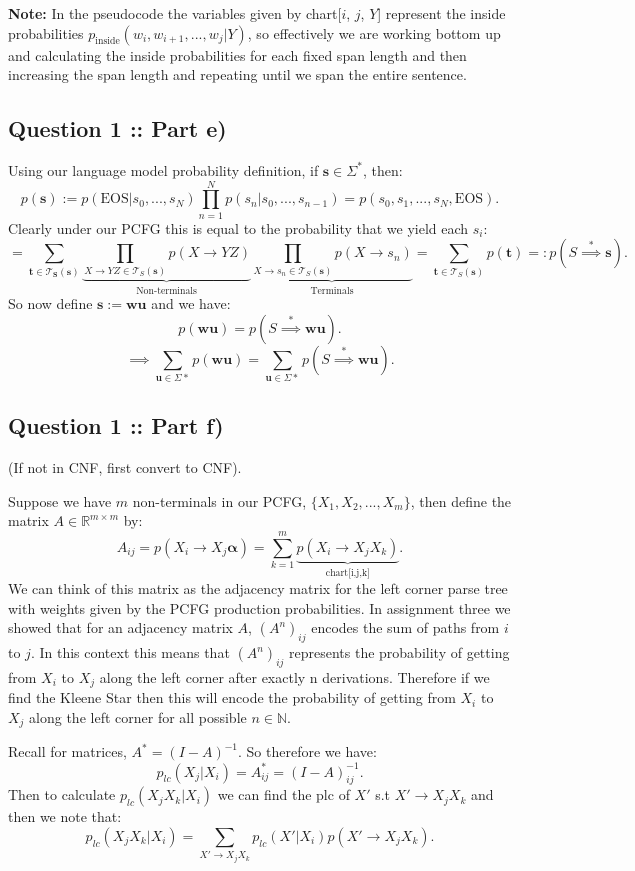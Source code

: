\documentclass[a4paper]{article}
\begin{document}
\textbf{Note:} In the pseudocode the variables given by chart[$i$, $j$, $Y$]
represent the inside probabilities $p_{\text{inside}}(w_i, w_{i+1}, ..., w_{j} | Y)$,
so effectively we are working bottom up and calculating the inside probabilities for each 
fixed span length and then increasing the span length and repeating until we span the entire sentence.

\subsection*{Question 1 :: Part e)}
Using our language model probability definition, if $\bm{s}\in \Sigma^*$, then:
\[
p(\bm{s}) := p(\text{EOS} | s_0, ..., s_N) \prod_{n=1}^{N} p(s_n | s_0,...,s_{n-1}) = p(s_0, s_1,..., s_N, \text{EOS})
.\]
Clearly under our PCFG this is equal to the probability that we yield each $s_i$:
 \[
     = \sum_{\bm{t \in \mathcal{T}_S(\bm{s})}} \underbrace{\prod_{X\to Y Z \in \mathcal{T}_S(\bm{s})} p(X\to Y Z)}_{\text{Non-terminals}} \underbrace{\prod_{X\to s_n \in \mathcal{T}_S(\bm{s})} p(X\to s_n) }_{\text{Terminals}} = \sum_{\bm{t} \in \mathcal{T}_S(\bm{s})} p(\bm{t}) =: p(S \stackrel{*}{\implies} \bm{s})
.\]
So now define $\bm{s}:=\bm{wu}$ and we have:
\[
p(\bm{wu}) =  p(S \stackrel{*}{\implies} \bm{wu})
.\]
\[
\implies \sum_{\bm{u} \in \Sigma*} p(\bm{wu}) =  \sum_{\bm{u} \in \Sigma*}  p(S \stackrel{*}{\implies} \bm{wu})
.\]
\subsection*{Question 1 :: Part f)}
(If not in CNF, first convert to CNF).

Suppose we have $m$ non-terminals in our PCFG, $\{X_1, X_2, ..., X_m\} $,
then define the matrix $A \in \mathbb{R}^{m\times m}$ by:
\[
    A_{ij} = p(X_i \to X_j \bm{\alpha}) = \sum_{k=1}^{m} \underbrace{p(X_i \to X_j X_k)}_{\text{chart[i,j,k]}}
.\]
We can think of this matrix as the adjacency matrix for the left corner parse
tree with weights given by the PCFG production probabilities. In assignment three we showed
that for an adjacency matrix $A$, $(A^n)_{ij}$ encodes the sum of paths from $i$ to  $j$.
In this context this means that $(A^n)_{ij}$ represents the probability of getting
from $X_i$ to $X_j$ along the left corner after exactly n derivations.
Therefore if we find the Kleene Star then this will encode the probability of
getting from $X_i$ to $X_j$ along the left corner for all possible $n \in \mathbb{N}$.

Recall for matrices, $A^* = (I - A)^{-1}$.
So therefore we have:
\[
p_{lc}(X_j | X_i) = A^*_{ij} = (I - A)^{-1}_{ij}
.\]
Then to calculate $p_{lc}(X_j X_k | X_i)$ we can find the plc of $X'$ 
s.t $X' \to X_j X_k$ and then we note that:
\[
p_{lc}(X_j X_k | X_i) = \sum_{X' \to X_j X_k} p_{lc}(X' | X_i) p(X' \to X_j X_k)
.\]
\end{document}
